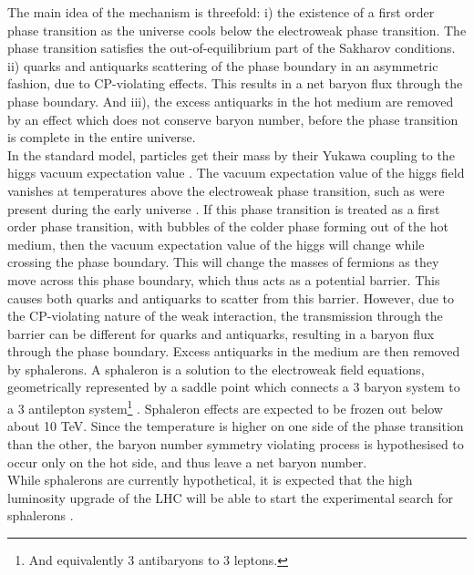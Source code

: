 The main idea of the mechanism is threefold: i) the existence of a first order phase transition as the universe cools below the electroweak phase transition. The phase transition satisfies the out-of-equilibrium part of the Sakharov conditions. ii) quarks and antiquarks scattering of the phase boundary in an asymmetric fashion, due to CP-violating effects. This results in a net baryon flux through the phase boundary. And iii), the excess antiquarks in the hot medium are removed by an effect which does not conserve baryon number, before the phase transition is complete in the entire universe. \\
In the standard model, particles get their mass by their Yukawa coupling to the higgs vacuum expectation value \cite{SANTAMARIA199390}. The vacuum expectation value of the higgs field vanishes at temperatures above the electroweak phase transition, such as were present during the early universe \cite{Higgs_vev_highT}. If this phase transition is treated as a first order phase transition, with bubbles of the colder phase forming out of the hot medium, then the vacuum expectation value of the higgs will change while crossing the phase boundary. This will change the masses of fermions as they move across this phase boundary, which thus acts as a potential barrier. This causes both quarks and antiquarks to scatter from this barrier. However, due to the CP-violating nature of the weak interaction, the transmission through the barrier can be different for quarks and antiquarks, resulting in a baryon flux through the phase boundary. Excess antiquarks in the medium are then removed by sphalerons. A sphaleron is a solution to the electroweak field equations, geometrically represented by a saddle point which connects a 3 baryon system to a 3 antilepton system\footnote{And equivalently 3 antibaryons to 3 leptons.} \cite{Phong_2020}. Sphaleron effects are expected to be frozen out below about 10 TeV. Since the temperature is higher on one side of the phase transition than the other, the baryon number symmetry violating process is hypothesised to occur only on the hot side, and thus leave a net baryon number.  \\

While sphalerons are currently hypothetical, it is expected that the high luminosity upgrade of the LHC will be able to start the experimental search for sphalerons \cite{Papaefstathiou_2019}.


